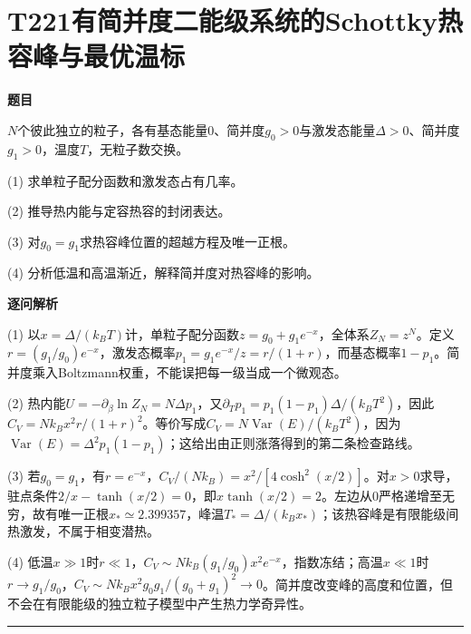 \documentclass[UTF8,a4paper,11pt,oneside,openany]{ctexbook}
\begin{document}
\section*{T221\quad 有简并度二能级系统的Schottky热容峰与最优温标}
\textbf{题目}\par
$N$个彼此独立的粒子，各有基态能量0、简并度$g_0>0$与激发态能量$\Delta>0$、简并度$g_1>0$，温度$T$，无粒子数交换。
\par\smallskip\noindent (1) 求单粒子配分函数和激发态占有几率。
\par\smallskip\noindent (2) 推导热内能与定容热容的封闭表达。
\par\smallskip\noindent (3) 对$g_0=g_1$求热容峰位置的超越方程及唯一正根。
\par\smallskip\noindent (4) 分析低温和高温渐近，解释简并度对热容峰的影响。
\par\medskip\textbf{逐问解析}\par
\par\smallskip\noindent (1) 以$x=\Delta/(k_BT)$计，单粒子配分函数$z=g_0+g_1e^{-x}$，全体系$Z_N=z^N$。定义$r=(g_1/g_0)e^{-x}$，激发态概率$p_1=g_1e^{-x}/z=r/(1+r)$，而基态概率$1-p_1$。简并度乘入Boltzmann权重，不能误把每一级当成一个微观态。
\par\smallskip\noindent (2) 热内能$U=-\partial_\beta\ln Z_N=N\Delta p_1$，又$\partial_Tp_1=p_1(1-p_1)\Delta/(k_BT^2)$，因此$C_V=Nk_Bx^2r/(1+r)^2$。等价写成$C_V=N\operatorname{Var}(E)/(k_BT^2)$，因为$\operatorname{Var}(E)=\Delta^2p_1(1-p_1)$；这给出由正则涨落得到的第二条检查路线。
\par\smallskip\noindent (3) 若$g_0=g_1$，有$r=e^{-x}$，$C_V/(Nk_B)=x^2/[4\cosh^2(x/2)]$。对$x>0$求导，驻点条件$2/x-\tanh(x/2)=0$，即$x\tanh(x/2)=2$。左边从0严格递增至无穷，故有唯一正根$x_*\simeq2.399357$，峰温$T_*=\Delta/(k_Bx_*)$；该热容峰是有限能级间热激发，不属于相变潜热。
\par\smallskip\noindent (4) 低温$x\gg1$时$r\ll1$，$C_V\sim Nk_B(g_1/g_0)x^2e^{-x}$，指数冻结；高温$x\ll1$时$r\to g_1/g_0$，$C_V\sim Nk_Bx^2g_0g_1/(g_0+g_1)^2\to0$。简并度改变峰的高度和位置，但不会在有限能级的独立粒子模型中产生热力学奇异性。
\par\medskip\hrule\medskip
\end{document}
